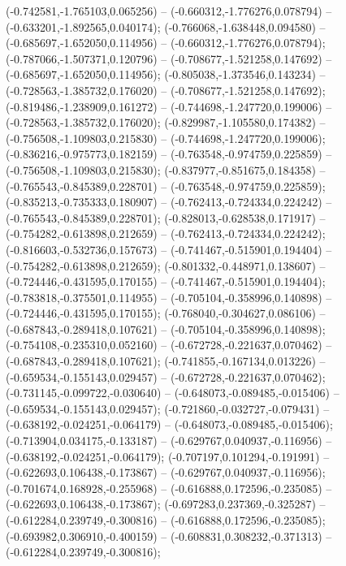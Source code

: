  (-0.742581,-1.765103,0.065256) -- (-0.660312,-1.776276,0.078794) -- (-0.633201,-1.892565,0.040174);
 (-0.766068,-1.638448,0.094580) -- (-0.685697,-1.652050,0.114956) -- (-0.660312,-1.776276,0.078794);
 (-0.787066,-1.507371,0.120796) -- (-0.708677,-1.521258,0.147692) -- (-0.685697,-1.652050,0.114956);
 (-0.805038,-1.373546,0.143234) -- (-0.728563,-1.385732,0.176020) -- (-0.708677,-1.521258,0.147692);
 (-0.819486,-1.238909,0.161272) -- (-0.744698,-1.247720,0.199006) -- (-0.728563,-1.385732,0.176020);
 (-0.829987,-1.105580,0.174382) -- (-0.756508,-1.109803,0.215830) -- (-0.744698,-1.247720,0.199006);
 (-0.836216,-0.975773,0.182159) -- (-0.763548,-0.974759,0.225859) -- (-0.756508,-1.109803,0.215830);
 (-0.837977,-0.851675,0.184358) -- (-0.765543,-0.845389,0.228701) -- (-0.763548,-0.974759,0.225859);
 (-0.835213,-0.735333,0.180907) -- (-0.762413,-0.724334,0.224242) -- (-0.765543,-0.845389,0.228701);
 (-0.828013,-0.628538,0.171917) -- (-0.754282,-0.613898,0.212659) -- (-0.762413,-0.724334,0.224242);
 (-0.816603,-0.532736,0.157673) -- (-0.741467,-0.515901,0.194404) -- (-0.754282,-0.613898,0.212659);
 (-0.801332,-0.448971,0.138607) -- (-0.724446,-0.431595,0.170155) -- (-0.741467,-0.515901,0.194404);
 (-0.783818,-0.375501,0.114955) -- (-0.705104,-0.358996,0.140898) -- (-0.724446,-0.431595,0.170155);
 (-0.768040,-0.304627,0.086106) -- (-0.687843,-0.289418,0.107621) -- (-0.705104,-0.358996,0.140898);
 (-0.754108,-0.235310,0.052160) -- (-0.672728,-0.221637,0.070462) -- (-0.687843,-0.289418,0.107621);
 (-0.741855,-0.167134,0.013226) -- (-0.659534,-0.155143,0.029457) -- (-0.672728,-0.221637,0.070462);
 (-0.731145,-0.099722,-0.030640) -- (-0.648073,-0.089485,-0.015406) -- (-0.659534,-0.155143,0.029457);
 (-0.721860,-0.032727,-0.079431) -- (-0.638192,-0.024251,-0.064179) -- (-0.648073,-0.089485,-0.015406);
 (-0.713904,0.034175,-0.133187) -- (-0.629767,0.040937,-0.116956) -- (-0.638192,-0.024251,-0.064179);
 (-0.707197,0.101294,-0.191991) -- (-0.622693,0.106438,-0.173867) -- (-0.629767,0.040937,-0.116956);
 (-0.701674,0.168928,-0.255968) -- (-0.616888,0.172596,-0.235085) -- (-0.622693,0.106438,-0.173867);
 (-0.697283,0.237369,-0.325287) -- (-0.612284,0.239749,-0.300816) -- (-0.616888,0.172596,-0.235085);
 (-0.693982,0.306910,-0.400159) -- (-0.608831,0.308232,-0.371313) -- (-0.612284,0.239749,-0.300816);
